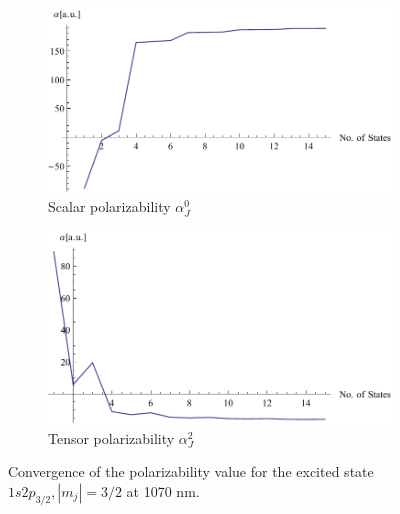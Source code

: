 \begin{figure}[H]
\centering
\begin{subfigure}[b]{0.4\textwidth}
                \includegraphics[width=\textwidth]{alphascalarconvexcited}
                \caption{Scalar polarizability $\alpha^0_J$}
\end{subfigure}
\begin{subfigure}[b]{0.4\textwidth}
               \includegraphics[width=\textwidth]{alphatensorconvexcited}
                \caption{Tensor polarizability $\alpha^2_J$}
\end{subfigure}


\caption{Convergence of the polarizability value for the excited state $1s2p_{3/2}, |m_j|=3/2$ at 1070 nm.}
\label{alphaconv}
\end{figure}

